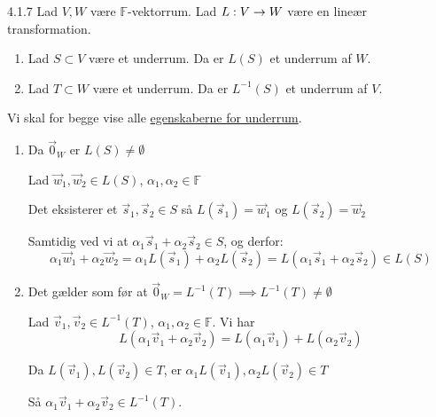 \begin{saetning}{4.1.7}
	Lad $V,W$ være $\mathbb{F}$-vektorrum. Lad $L: V \rightarrow W$ være en lineær
	transformation.

	\begin{enumerate}
		\item Lad $S \subset V$ være et underrum. Da er $L(S)$ et underrum af 
			$W$.
		\item Lad $T \subset W$ være et underrum. Da er $L^{-1}(S)$ et underrum
			af $V$.
	\end{enumerate}
\end{saetning}

\begin{bevis}
	Vi skal for begge vise alle
	\hyperlink{def:underrum}{egenskaberne for underrum}.
	\begin{enumerate}
		\item Da $\vec{0}_W$ er $L(S) \ne \emptyset$

			Lad $\vec{w}_1, \vec{w}_2 \in L(S)$, $\alpha_1, \alpha_2 \in \mathbb{F}$
			
			Det eksisterer et $\vec{s}_1, \vec{s}_2 \in S$ så
			$L(\vec{s}_1)=\vec{w}_1$ og $L(\vec{s}_2)=\vec{w}_2$

			Samtidig ved vi at $\alpha_1\vec{s}_1 + \alpha_2\vec{s}_2 \in S$,
			og derfor:
			$$
			\alpha_1\vec{w}_1 + \alpha_2\vec{w}_2 = \alpha_1L(\vec{s}_1) +
			\alpha_2L(\vec{s}_2) = L(\alpha_1\vec{s}_1 + \alpha_2\vec{s}_2)
			\in L(S)
			$$
		\item Det gælder som før at $\vec{0}_W = L^{-1}(T) \implies
			L^{-1}(T) \ne \emptyset$

			Lad $\vec{v}_1, \vec{v}_2 \in L^{-1}(T)$,
			$\alpha_1, \alpha_2 \in \mathbb{F}$. Vi har
			$$ L(\alpha_1\vec{v}_1 + \alpha_2\vec{v}_2) = L(\alpha_1\vec{v}_1)
			+ L(\alpha_2\vec{v}_2) $$

			Da $L(\vec{v}_1), L(\vec{v}_2) \in T$, er $\alpha_1 L(\vec{v}_1),
			\alpha_2 L(\vec{v}_2) \in T$

			Så $\alpha_1\vec{v}_1 + \alpha_2\vec{v}_2 \in L^{-1}(T)$.
	\end{enumerate}
\end{bevis}
